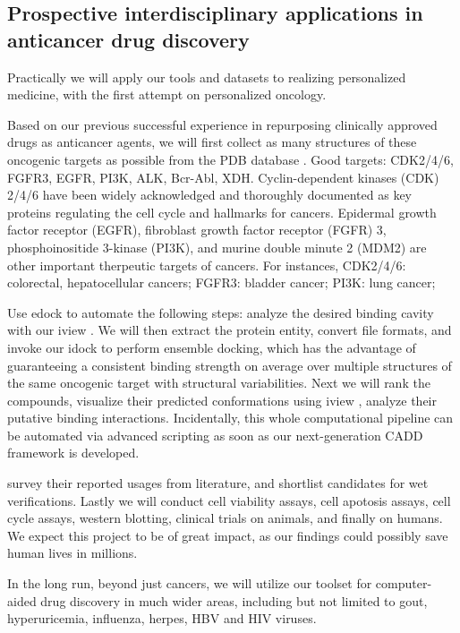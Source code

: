 \documentclass[a4paper,12pt]{article}
\begin{document}
\subsection*{Prospective interdisciplinary applications in anticancer drug discovery}

Practically we will apply our tools and datasets to realizing personalized medicine, with the first attempt on personalized oncology.

Based on our previous successful experience in repurposing clinically approved drugs as anticancer agents, we will first collect as many structures of these oncogenic targets as possible from the PDB database \citep{537}. Good targets: CDK2/4/6, FGFR3, EGFR, PI3K, ALK, Bcr-Abl, XDH. Cyclin-dependent kinases (CDK) 2/4/6 have been widely acknowledged and thoroughly documented as key proteins regulating the cell cycle and hallmarks for cancers. Epidermal growth factor receptor (EGFR), fibroblast growth factor receptor (FGFR) 3, phosphoinositide 3-kinase (PI3K), and murine double minute 2 (MDM2) are other important therpeutic targets of cancers. For instances, CDK2/4/6: colorectal, hepatocellular cancers; FGFR3: bladder cancer; PI3K: lung cancer;

Use edock to automate the following steps: analyze the desired binding cavity with our iview \citep{1366}. We will then extract the protein entity, convert file formats, and invoke our idock \citep{1153} to perform ensemble docking, which has the advantage of guaranteeing a consistent binding strength on average over multiple structures of the same oncogenic target with structural variabilities. Next we will rank the compounds, visualize their predicted conformations using iview \citep{1366}, analyze their putative binding interactions. Incidentally, this whole computational pipeline can be automated via advanced scripting as soon as our next-generation CADD framework is developed.

survey their reported usages from literature, and shortlist candidates for wet verifications. Lastly we will conduct cell viability assays, cell apotosis assays, cell cycle assays, western blotting, clinical trials on animals, and finally on humans. We expect this project to be of great impact, as our findings could possibly save human lives in millions.

In the long run, beyond just cancers, we will utilize our toolset for computer-aided drug discovery in much wider areas, including but not limited to gout, hyperuricemia, influenza, herpes, HBV and HIV viruses.
\end{document}
